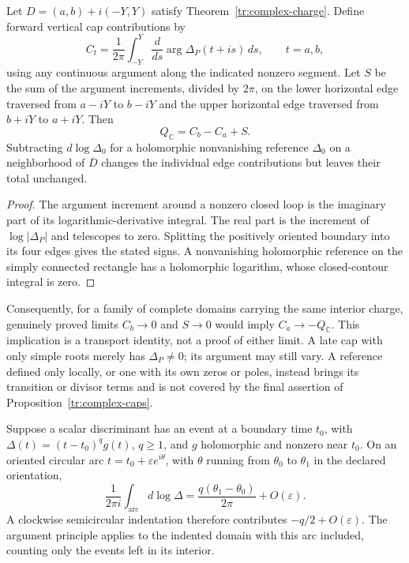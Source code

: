 \begin{proposition}\label{tr:complex-caps}
Let $D=(a,b)+i(-Y,Y)$ satisfy Theorem~\ref{tr:complex-charge}.  Define
forward vertical cap contributions by
\[
 C_t=\frac1{2\pi}\int_{-Y}^{Y}
             \frac{d}{ds}\arg\Delta_P(t+is)\,ds,
                        \qquad t=a,b,
\]
using any continuous argument along the indicated nonzero segment.
Let $S$ be the sum of the argument increments, divided by $2\pi$, on
the lower horizontal edge traversed from $a-iY$ to $b-iY$ and the upper
horizontal edge traversed from $b+iY$ to $a+iY$.  Then
\begin{equation}\label{tr:complex-cap-balance}
                      Q_{\mathbb C}=C_b-C_a+S.
\end{equation}
Subtracting $d\log\Delta_0$ for a holomorphic nonvanishing reference
$\Delta_0$ on a neighborhood of $\overline D$ changes the individual
edge contributions but leaves their total unchanged.
\end{proposition}

\begin{proof}
The argument increment around a nonzero closed loop is the imaginary
part of its logarithmic-derivative integral.  The real part is the
increment of $\log|\Delta_P|$ and telescopes to zero.  Splitting the
positively oriented boundary into its four edges gives the stated
signs.  A nonvanishing holomorphic reference on the simply connected
rectangle has a holomorphic logarithm, whose closed-contour integral
is zero.
\end{proof}

Consequently, for a family of complete domains carrying the same
interior charge, genuinely proved limits $C_b\to0$ and $S\to0$ would
imply $C_a\to-Q_{\mathbb C}$.  This implication is a transport identity,
not a proof of either limit.  A late cap with only simple roots merely
has $\Delta_P\ne0$; its argument may still vary.  A reference defined
only locally, or one with its own zeros or poles, instead brings its
transition or divisor terms and is not covered by the final assertion
of Proposition~\ref{tr:complex-caps}.

\begin{proposition}
\label{tr:indentation}
Suppose a scalar discriminant has an event at a boundary time $t_0$,
with $\Delta(t)=(t-t_0)^q g(t)$, $q\geq1$, and $g$ holomorphic and
nonzero near $t_0$.  On an oriented circular arc
$t=t_0+\varepsilon e^{i\theta}$, with $\theta$ running from
$\theta_0$ to $\theta_1$ in the declared orientation,
\begin{equation}\label{tr:arc-term}
 \frac1{2\pi i}\int_{\mathrm{arc}}d\log\Delta
        =\frac{q(\theta_1-\theta_0)}{2\pi}+O(\varepsilon).
\end{equation}
A clockwise semicircular indentation therefore contributes
$-q/2+O(\varepsilon)$.  The argument principle applies to the indented
domain with this arc included, counting only the events left in its
interior.
\end{proposition}

